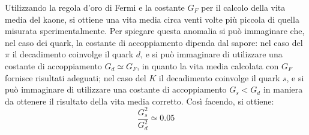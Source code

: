 \documentclass{subnucbo}
\begin{document}
Utilizzando la regola d'oro di Fermi e la costante $G_{F}$ per il calcolo della vita media del kaone, si ottiene una vita media circa venti volte più piccola di quella misurata sperimentalmente. Per spiegare questa anomalia si può immaginare che, nel caso dei quark, la costante di accoppiamento dipenda dal sapore: nel caso del $\pi$ il decadimento coinvolge il quark $d$, e si può immaginare di utilizzare una costante di accoppiamento $G _ { d } \simeq G _ { F }$, in quanto la vita media calcolata con $G_{F}$ fornisce risultati adeguati; nel caso del $K$ il decadimento coinvolge il quark $s$, e si può immaginare di utilizzare una costante di accoppiamento $G _ { s } < G _ { d }$ in maniera da ottenere il risultato della vita media corretto. Così facendo, si ottiene:
\begin{equation}
        \frac { G _ { s } ^ { 2 } } { G _ { d } ^ { 2 } } \simeq 0.05
        \label{eq:frac_lepton_decay}
\end{equation}
\end{document}
